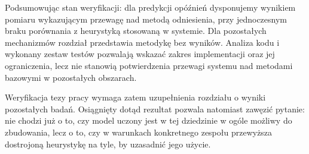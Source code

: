 Podsumowując stan weryfikacji: dla predykcji opóźnień dysponujemy wynikiem pomiaru wykazującym przewagę nad metodą odniesienia, przy jednoczesnym braku porównania z heurystyką stosowaną w systemie. Dla pozostałych mechanizmów rozdział przedstawia metodykę bez wyników. Analiza kodu i wykonany zestaw testów pozwalają wskazać zakres implementacji oraz jej ograniczenia, lecz nie stanowią potwierdzenia przewagi systemu nad metodami bazowymi w pozostałych obszarach.

Weryfikacja tezy pracy wymaga zatem uzupełnienia rozdziału o wyniki pozostałych badań. Osiągnięty dotąd rezultat pozwala natomiast zawęzić pytanie: nie chodzi już o to, czy model uczony jest w tej dziedzinie w ogóle możliwy do zbudowania, lecz o to, czy w warunkach konkretnego zespołu przewyższa dostrojoną heurystykę na tyle, by uzasadnić jego użycie.